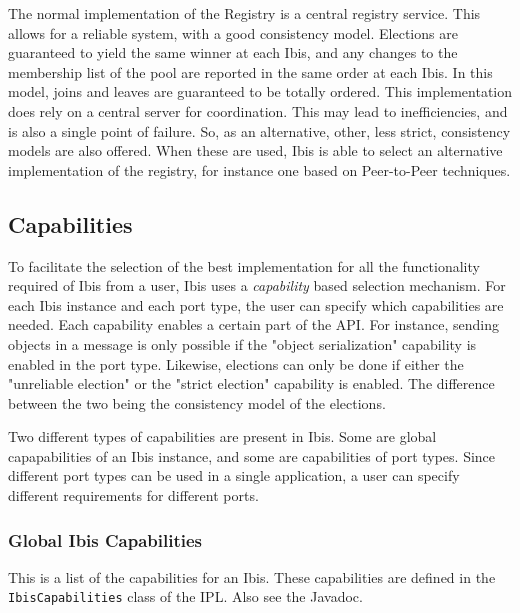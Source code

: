 \documentclass[10pt]{article}
\begin{document}
The normal implementation of the Registry is a central registry service.
This allows for a reliable system, with a good consistency model.
Elections are guaranteed to yield the same winner at each Ibis, and any
changes to the membership list of the pool are reported in the same
order at each Ibis. In this model, joins and leaves are guaranteed to be
totally ordered. This implementation does rely on a central server
for coordination. This may lead to inefficiencies, and is also a single
point of failure. So, as an alternative, other, less strict, consistency
models are also offered. When these are used, Ibis is able to select an
alternative implementation of the registry, for instance one based on
Peer-to-Peer techniques.

\subsection{Capabilities}

To facilitate the selection of the best implementation for all the
functionality required of Ibis from a user, Ibis uses a
\emph{capability} based selection mechanism. For each Ibis instance and
each port type, the user can specify which capabilities are needed. Each
capability enables a certain part of the API. For instance, sending
objects in a message is only possible if the "object serialization"
capability is enabled in the port type. Likewise, elections can only be
done if either the "unreliable election" or the "strict election"
capability is enabled. The difference between the two being the
consistency model of the elections. 

Two different types of capabilities are present in Ibis. Some are global
capapabilities of an Ibis instance, and some are capabilities of port
types. Since different port types can be used in a single application, a
user can specify different requirements for different ports.

\subsubsection{Global Ibis Capabilities}

This is a list of the capabilities for an Ibis. These capabilities are
defined in the \texttt{IbisCapabilities} class of the IPL. Also see the
Javadoc.  
\end{document}
